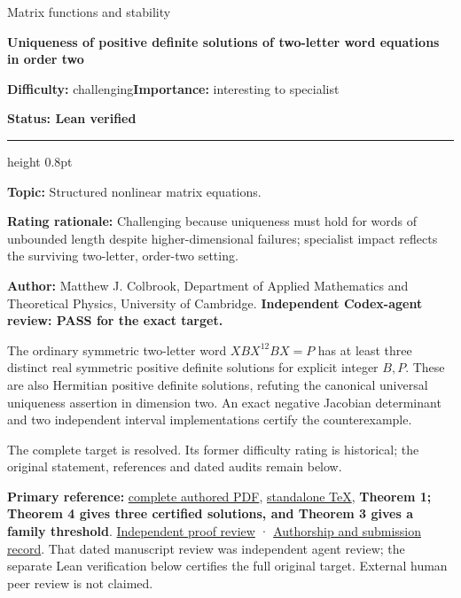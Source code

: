 \documentclass[11pt,a4paper]{article}
\makeatletter
\renewcommand{\subsection}{\Needspace{4\baselineskip}\@startsection{subsection}{2}{0pt}{9pt plus 1pt minus 1pt}{3pt}{\sffamily\bfseries\normalsize\color{ink}}}
\makeatother
\begin{document}
{\sffamily\small\color{muted}Matrix functions and stability\par}
\vspace{3pt}
{\raggedright{}\sffamily\bfseries\fontsize{21}{24}\selectfont\color{ink}Uniqueness
of positive definite solutions of two-letter word equations in order
two\par}
\vspace{7pt}
{\sffamily\small\textbf{Difficulty:} challenging\quad\textbf{Importance:} interesting
to specialist\par}
{\sffamily\small\bfseries\color{accent}Status: Lean verified\par}
\vspace{4pt}
{\color{accent}\hrule height 0.8pt}
\vspace{6pt}
\textbf{Topic:} Structured nonlinear matrix equations.

\textbf{Rating rationale:} Challenging because uniqueness must hold for
words of unbounded length despite higher-dimensional failures;
specialist impact reflects the surviving two-letter, order-two setting.

\subsection{Resolution --- 2026-09-11}\label{resolution-2026-09-11}

\textbf{Author:} Matthew J. Colbrook, Department of Applied Mathematics
and Theoretical Physics, University of Cambridge. \textbf{Independent
Codex-agent review: PASS for the exact target.}

The ordinary symmetric two-letter word \(XBX^{12}BX=P\) has at least
three distinct real symmetric positive definite solutions for explicit
integer \(B,P\). These are also Hermitian positive definite solutions,
refuting the canonical universal uniqueness assertion in dimension two.
An exact negative Jacobian determinant and two independent interval
implementations certify the counterexample.

The complete target is resolved. Its former difficulty rating is
historical; the original statement, references and dated audits remain
below.

\textbf{Primary reference:}
\href{https://github.com/ajt60gaibb/OpenProblemsInNLA/blob/main/references/colbrook-matrix-functions-2026-09-11/manuscripts/MF-16.pdf}{complete
authored PDF},
\href{https://github.com/ajt60gaibb/OpenProblemsInNLA/blob/main/references/colbrook-matrix-functions-2026-09-11/manuscripts/MF-16.tex}{standalone
TeX}, \textbf{Theorem 1; Theorem 4 gives three certified solutions, and
Theorem 3 gives a family threshold}.
\href{https://github.com/ajt60gaibb/OpenProblemsInNLA/blob/main/references/colbrook-matrix-functions-2026-09-11/verification/reviews/MF-16-review.md}{Independent
proof review} ·
\href{https://github.com/ajt60gaibb/OpenProblemsInNLA/blob/main/references/colbrook-matrix-functions-2026-09-11/README.md}{Authorship
and submission record}. That dated manuscript review was independent
agent review; the separate Lean verification below certifies the full
original target. External human peer review is not claimed.
\end{document}
